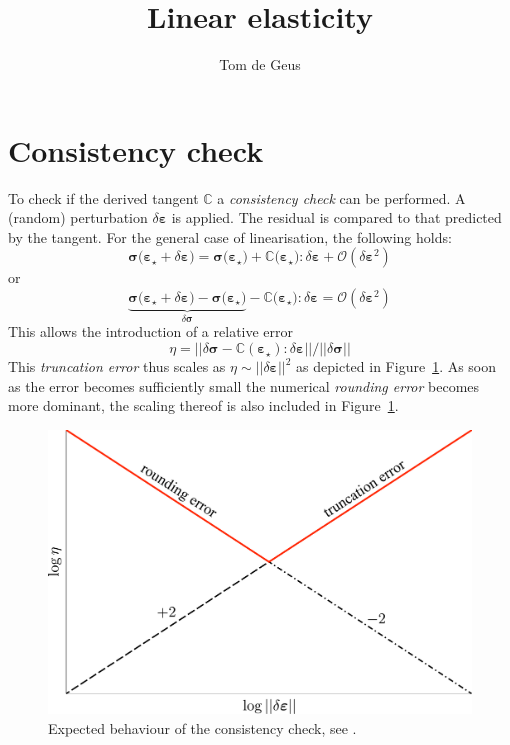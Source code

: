 \documentclass[garamond]{goose-article}
\title{Linear elasticity}
\author[1]{Tom de Geus}
\begin{document}
\maketitle



\section{Consistency check}

To check if the derived tangent $\mathbb{C}$ a \emph{consistency check} can be performed. A (random) perturbation $\delta \bm{\varepsilon}$ is applied. The residual is compared to that predicted by the tangent. For the general case of linearisation, the following holds:
%
\begin{equation}
  \bm{\sigma}\big( \bm{\varepsilon}_\star + \delta \bm{\varepsilon} \big) =
  \bm{\sigma}\big( \bm{\varepsilon}_\star \big) +
  \mathbb{C} \big( \bm{\varepsilon}_\star \big) : \delta \bm{\varepsilon} +
  \mathcal{O}(\delta \bm{\varepsilon}^2)
\end{equation}
%
or
%
\begin{equation}
  \underbrace{
    \bm{\sigma}\big( \bm{\varepsilon}_\star + \delta \bm{\varepsilon} \big) -
    \bm{\sigma}\big( \bm{\varepsilon}_\star \big)
  }_{
    \displaystyle \delta \bm{\sigma}
  } -
  \mathbb{C} \big( \bm{\varepsilon}_\star \big) : \delta \bm{\varepsilon} =
  \mathcal{O}(\delta \bm{\varepsilon}^2)
\end{equation}
%
This allows the introduction of a relative error
%
\begin{equation}
  \eta =
  \Big|\Big|
    \delta \bm{\sigma} -
    \mathbb{C}(\bm{\varepsilon}_\star) : \delta \bm{\varepsilon}
  \Big|\Big|
  /
  \Big|\Big| \delta \bm{\sigma} \Big|\Big|
\end{equation}
%
This \emph{truncation error} thus scales as $\eta \sim || \delta \bm{\varepsilon} ||^2$ as depicted in Figure~\ref{fig:consistency:expected}. As soon as the error becomes sufficiently small the numerical \emph{rounding error} becomes more dominant, the scaling thereof is also included in Figure~\ref{fig:consistency:expected}.

\begin{figure}[htp]
  \centering
  \includegraphics[width=.5\textwidth]{figures/consistency}
  \caption{Expected behaviour of the consistency check, see \citet[p.~9]{Heath2002}.}
  \label{fig:consistency:expected}
\end{figure}
\end{document}
